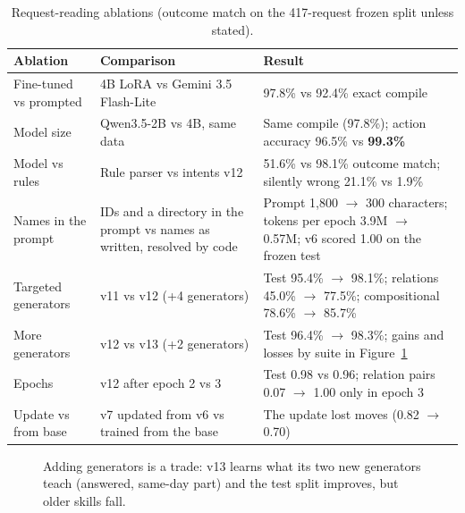 \documentclass[11pt,a4paper]{article}
\newcommand{\best}[1]{\textbf{#1}}
\begin{document}
\begin{table}[!htb]
\centering\small
\begin{tabularx}{\textwidth}{@{}L{3.0cm} L{4.6cm} Y@{}}
\toprule
\textbf{Ablation} & \textbf{Comparison} & \textbf{Result}\\
\midrule
Fine-tuned vs prompted & 4B LoRA vs Gemini 3.5 Flash-Lite & 97.8\% vs 92.4\% exact compile\\
Model size & Qwen3.5-2B vs 4B, same data & Same compile (97.8\%); action accuracy 96.5\% vs \best{99.3\%}\\
Model vs rules & Rule parser vs intents v12 & 51.6\% vs 98.1\% outcome match; silently wrong 21.1\% vs 1.9\%\\
Names in the prompt & IDs and a directory in the prompt vs names as written, resolved by code & Prompt 1,800 $\to$ 300 characters; tokens per epoch 3.9M $\to$ 0.57M; v6 scored 1.00 on the frozen test\\
Targeted generators & v11 vs v12 (+4 generators) & Test 95.4\% $\to$ 98.1\%; relations 45.0\% $\to$ 77.5\%; compositional 78.6\% $\to$ 85.7\%\\
More generators & v12 vs v13 (+2 generators) & Test 96.4\% $\to$ 98.3\%; gains and losses by suite in Figure~\ref{fig:abl-suites}\\
Epochs & v12 after epoch 2 vs 3 & Test 0.98 vs 0.96; relation pairs 0.07 $\to$ 1.00 only in epoch 3\\
Update vs from base & v7 updated from v6 vs trained from the base & The update lost moves (0.82 $\to$ 0.70)\\
\bottomrule
\end{tabularx}
\caption{Request-reading ablations (outcome match on the 417-request frozen split unless stated).}
\label{tab:abl-read}
\end{table}

\begin{figure}[!htb]
\centering
{}
\caption{Adding generators is a trade: v13 learns what its two new generators teach (answered, same-day part) and the
test split improves, but older skills fall.}
\label{fig:abl-suites}
\end{figure}
\end{document}
